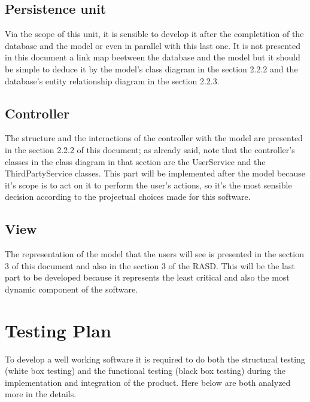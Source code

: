 \subsection{Persistence unit}
	Via the scope of this unit, it is sensible to develop it after the completition of the database and the model or even in parallel with this last one. It is not presented in this document a link map 	beetween the database and the model but it should be simple to deduce it by the model's class diagram in the section 2.2.2 and the database's entity relationship diagram in the section 			2.2.3.
\subsection{Controller}
	The structure and the interactions of the controller with the model are presented in the section 2.2.2  of this document; as already said, note that the controller's classes in the class 			diagram in that section are the UserService and the ThirdPartyService classes. This part will be implemented after the model because it's scope is to act on it to perform the user's actions, 		so it's the most sensible decision according to the projectual choices made for this software.
\subsection{View}
	The representation of the model that the users will see is presented in the section 3 of this document and also in the section 3 of the RASD. This will be the last part to be developed 			because it represents the least critical and also the most dynamic component of the software.

\section{Testing Plan}
To develop a well working software it is required to do both the structural testing (white box testing) and the functional testing (black box testing) during the implementation and integration of the product. Here below are both analyzed more in the details.

